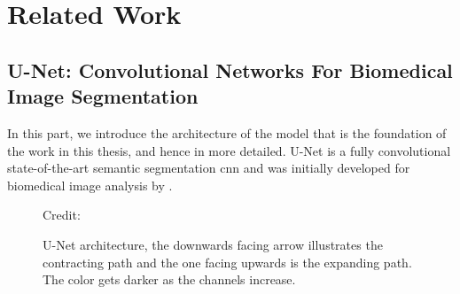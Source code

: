 \chapter{Related Work}

\section{U-Net: Convolutional Networks For Biomedical
Image Segmentation} \label{unet}

    In this part, we introduce the architecture of the model that is the foundation of the work in this thesis, and hence in  more detailed. U-Net is a fully convolutional state-of-the-art\cite{rajak2021segmentation} semantic segmentation \gls{cnn} and was initially developed for biomedical image analysis by \citeauthor{unet_ronneberger2015}\cite{unet_ronneberger2015}. 
    
    \begin{figure}[H]
        \centering
        
        \caption[U-Net architecture]{U-Net architecture, the downwards facing arrow illustrates the contracting path and the one facing upwards is the expanding path. The color gets darker as the channels increase.}
      	\medskip 
        \label{unet_fig}
        \hspace*{15pt}\hbox{\scriptsize Credit: \citeauthor{unet_ronneberger2015}\cite{unet_ronneberger2015}}
    \end{figure}
    
